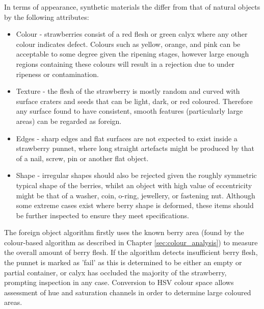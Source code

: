 \documentclass[fleqn,twoside,12pt]{report}
\begin{document}
In terms of appearance, synthetic materials the differ from that of natural objects by the following attributes:
\begin{itemize}
	\item Colour - strawberries consist of a red flesh or green calyx where any other colour indicates defect. Colours such as yellow, orange, and pink can be acceptable to some degree given the ripening stages, however large enough regions containing these colours will result in a rejection due to under ripeness or contamination.
	\item Texture - the flesh of the strawberry is mostly random and curved with surface craters and seeds that can be light, dark, or red coloured. Therefore any surface found to have consistent, smooth features (particularly large areas) can be regarded as foreign.
	\item Edges - sharp edges and flat surfaces are not expected to exist inside a strawberry punnet, where long straight artefacts might be produced by that of a nail, screw, pin or another flat object.
	\item Shape - irregular shapes should also be rejected given the roughly symmetric typical shape of the berries, whilst an object with high value of eccentricity might be that of a washer, coin, o-ring, jewellery, or fastening nut. Although some extreme cases exist where berry shape is deformed, these items should be further inspected to ensure they meet specifications.
\end{itemize}

The foreign object algorithm firstly uses the known berry area (found by the colour-based algorithm as described in Chapter \ref{sec:colour_analysis}) to measure the overall amount of berry flesh. If the algorithm detects insufficient berry flesh, the punnet is marked as 'fail' as this is determined to  be either an empty or partial container, or calyx has occluded the majority of the strawberry, prompting inspection in any case. Conversion to HSV colour space allows assessment of hue and saturation channels in order to determine large coloured areas. 
\end{document}
